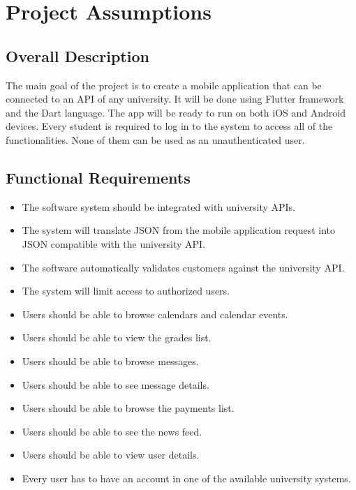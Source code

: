 \chapter{Project Assumptions}
\section{Overall Description}

The main goal of the project is to create a mobile application that can be connected to an API of any university. It will be done using Flutter framework and the Dart language. The app will be ready to run on both iOS and Android devices. Every student is required to log in to the system to access all of the functionalities. None of them can be used as an unauthenticated user.

\section{Functional Requirements}
\begin{itemize}
    \item The software system should be integrated with university APIs.
    \item The system will translate JSON from the mobile application request into JSON compatible with the university API.
    \item The software automatically validates customers against the university API.
    \item The system will limit access to authorized users.
    \item Users should be able to browse calendars and calendar events.
    \item Users should be able to view the grades list.
    \item Users should be able to browse messages.
    \item Users should be able to see message details.
    \item Users should be able to browse the payments list.
    \item Users should be able to see the news feed.
    \item Users should be able to view user details.
    \item Every user has to have an account in one of the available university systems.
\end{itemize}


